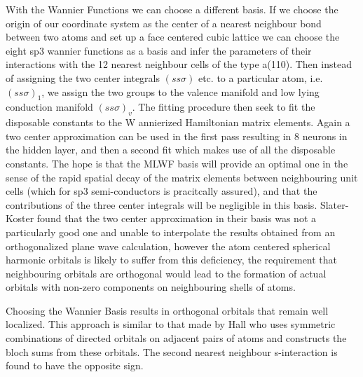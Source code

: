 With the Wannier Functions we can choose a different basis. If we choose the origin of our coordinate
system as the center of a nearest neighbour bond between two atoms and set up a face centered cubic lattice
we can choose the eight sp3 wannier functions as a basis and infer the parameters
of their interactions with the 12 nearest neighbour cells of the type a(110). Then instead
of assigning the two center integrals $(ss\sigma)$ etc. to a particular atom, 
i.e. $(ss\sigma)_1$, we assign the two groups to the valence manifold and low lying conduction manifold 
$(ss\sigma)_{v}$. The fitting procedure then seek to fit the disposable constants to the W
annierized Hamiltonian matrix elements. Again a two center approximation can be used in the first pass
resulting in 8 neurons in the hidden layer, and then a second fit which makes use of 
all the disposable constants. The hope is that the MLWF basis will provide an optimal one in the
sense of the rapid spatial decay of the matrix elements between neighbouring unit cells 
(which for sp3 semi-conductors is pracitcally assured), and that the contributions of the three center
integrals will be negligible in this basis. Slater-Koster found that the two center approximation in their
basis was not a particularly good one and unable to interpolate the results obtained
from an orthogonalized plane wave calculation, however the atom centered spherical harmonic orbitals is likely 
to suffer from this deficiency, the requirement that neighbouring orbitals are orthogonal would lead to 
the formation of actual orbitals with non-zero components on neighbouring shells of atoms. 

Choosing the Wannier Basis results in orthogonal orbitals that remain well localized. This approach is similar to
that made by Hall \cite{hall52} who uses symmetric  combinations of directed orbitals
on adjacent pairs of atoms and constructs the bloch sums from these orbitals.
The second nearest neighbour s-interaction is found to have the opposite sign.


